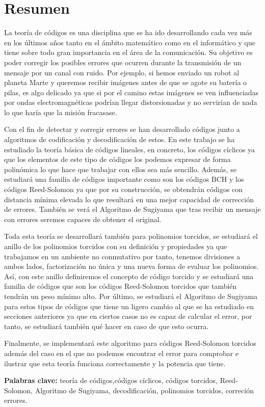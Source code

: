 


\chapter*{Resumen}

La teoría de códigos es una disciplina que se ha ido desarrollando cada vez más en los últimos años tanto en el ámbito matemático como en el informático y que tiene sobre todo gran importancia en el área de la comunicación. Su objetivo es poder corregir los posibles errores que ocurren durante la transmisión de un mensaje por un canal con ruido. Por ejemplo, si hemos enviado un robot al planeta Marte y queremos recibir imágenes antes de que se agote su batería o pilas, es algo delicado ya que si por el camino estas imágenes se ven influenciadas por ondas electromagnéticas podrían llegar distorsionadas y no servirían de nada lo que haría que la misión fracasase.

Con el fin de detectar y corregir errores se han desarrollado códigos junto a algoritmos de codificación y decodificación de estos. En este trabajo se ha estudiado la teoría básica de códigos lineales, en concreto, los códigos cíclicos ya que los elementos de este tipo de códigos los podemos expresar de forma polinómica lo que hace que trabajar con ellos sea más sencillo. Además, se estudiará una familia de códigos importante como son los códigos BCH y los códigos Reed-Solomon ya que por su construcción, se obtendrán códigos con distancia mínima elevada lo que resultará en una mejor capacidad de corrección de errores. También se verá el Algoritmo de Sugiyama que tras recibir un mensaje con errores seremos capaces de obtener el original. 

Toda esta teoría se desarrollará también para polinomios torcidos, se estudiará el anillo de los polinomios torcidos con su definición y propiedades ya que trabajamos en un ambiente no conmutativo por tanto, tenemos divisiones a ambos lados, factorización no única y una nueva forma de evaluar los polinomios. Así, con este anillo definiremos el concepto de código torcido y se estudiará una familia de códigos que son los códigos Reed-Solomon torcidos que también tendrán un peso mínimo alto. Por último, se estudiará el Algoritmo de Sugiyama para estos tipos de códigos que tiene un ligero cambio al que se ha estudiado en secciones anteriores ya que en ciertos casos no es capaz de calcular el error, por tanto, se estudiará también qué hacer en caso de que esto ocurra.

Finalmente, se implementará este algoritmo para códigos Reed-Solomon torcidos además del caso en el que no podemos encontrar el error para comprobar e ilustrar que esta teoría funciona correctamente y la potencia que tiene. 

\textbf{Palabras clave:} teoría de códigos,códigos cíclicos, códigos torcidos, Reed-Solomon, Algoritmo de Sugiyama, decodificación, polinomios torcidos, correción errores. 
